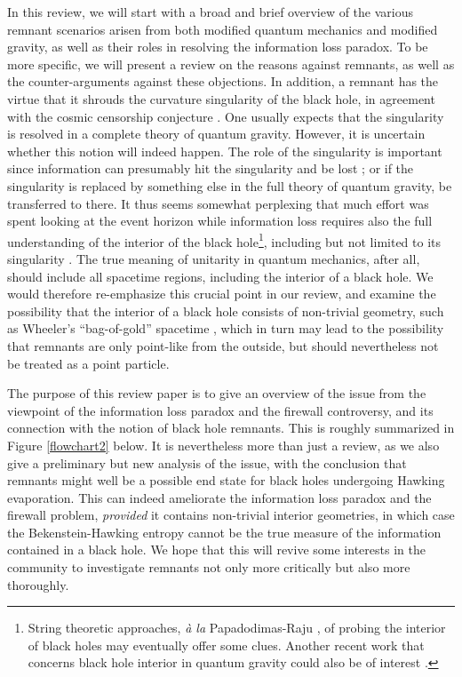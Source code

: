 \documentclass[12pt]{article}
\newcommand{\2}{$^2$}
\newcommand{\3}{$^3$}
\newcommand{\4}{$_4$}
\newcommand{\5}{$_5$}
\begin{document}
In this review, we will start with a broad and brief overview of the various remnant scenarios arisen from both modified quantum mechanics and modified gravity, as well as their roles
in resolving the information loss paradox.
To be more specific, we will present a review on the reasons against remnants, as well as the counter-arguments against these objections. In addition, a remnant has the virtue that it shrouds the curvature singularity of the black hole, in agreement with the cosmic censorship conjecture \cite{penrose}. One usually expects that the singularity is resolved in a complete theory of quantum gravity. However, it is uncertain whether this notion will indeed happen.
The role of the singularity is important since information can presumably hit the singularity and be lost \cite{Wald1, HP, ellis}; or if the singularity is replaced by something else in the full theory of quantum gravity, be transferred to there. It thus seems somewhat perplexing that much effort was spent looking at the event horizon while information loss requires also the full understanding of the interior of the black hole\footnote{String theoretic approaches, \emph{\`a la} Papadodimas-Raju \cite{raju1, raju2, raju3, monica}, of probing the interior of black holes may eventually offer some clues. Another recent work that concerns black hole interior in quantum gravity could also be of interest \cite{1412.7539}.}, including but not limited to its singularity \cite{sabine}. The true meaning of unitarity in quantum mechanics, after all, should include all spacetime regions, including the interior of a black hole.
We would therefore re-emphasize this crucial point in our review, and examine the possibility that the interior of a black hole consists of non-trivial geometry, such as Wheeler's ``bag-of-gold'' spacetime \cite{wheeler}, which in turn may lead to the possibility that remnants are only point-like from the outside, but should nevertheless not be treated as a point particle.   

The purpose of this review paper is to give an overview of the issue from the viewpoint of the information loss paradox and the firewall controversy, and its connection with the notion of black hole remnants. This is roughly summarized in Figure \ref{flowchart2} below.
It is nevertheless more than just a review, as we also give a preliminary but new analysis of the issue, with the conclusion that remnants might well be a possible end state for black holes undergoing Hawking evaporation. This
can indeed ameliorate the information loss paradox and the firewall problem, \emph{provided} it contains non-trivial interior geometries, in which case the Bekenstein-Hawking entropy cannot be the true measure of the information contained in a black hole. 
We hope that this will revive some interests in the community to investigate remnants not only more critically but also more thoroughly. 
\end{document}
